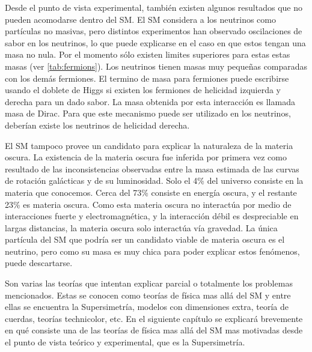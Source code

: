 Desde el punto de vista experimental, también existen algunos resultados que no
pueden acomodarse dentro del SM. El SM considera a los neutrinos como partículas
no masivas, pero distintos
experimentos\cite{PhysRevLett.101.111301,PhysRevD.78.032002} han observado
oscilaciones de sabor en los neutrinos, lo que puede explicarse en el caso en
que estos tengan una masa no nula. Por el momento sólo existen limites
superiores para estas estas masas (ver \cref{tab:fermions}). Los neutrinos
tienen masas muy peque\~nas comparadas con los demás fermiones. El termino de
masa para fermiones puede escribirse usando el doblete de Higgs si existen los
fermiones de helicidad izquierda y derecha para un dado sabor. La masa obtenida
por esta interacción es llamada masa de Dirac. Para que este mecanismo puede ser
utilizado en los neutrinos, deberían existe los neutrinos de helicidad derecha.

El SM tampoco provee un candidato para explicar la naturaleza de la materia
oscura. La existencia de la materia oscura fue inferida por primera vez como
resultado de las inconsistencias observadas entre la masa estimada de las curvas
de rotación galácticas y de su luminosidad\cite{DM1}.
Solo el 4\% del universo consiste en la materia que
conocemos\cite{DM2}. Cerca del 73\% consiste en energía oscura, y el restante
23\% es materia oscura. Como esta materia oscura no interactúa por medio de
interacciones fuerte y electromagnética, y la interacción débil es despreciable
en largas distancias, la materia oscura solo interactúa vía gravedad. La única
partícula del SM que podría ser un candidato viable de materia oscura es el
neutrino, pero como su masa es muy chica para poder explicar estos fenómenos,
puede descartarse.


Son varias las teorías que intentan explicar parcial o totalmente los problemas
mencionados. Estas se conocen como teorías de física mas allá del SM y entre
ellas se encuentra la Supersimetría, modelos con dimensiones extra, teoría de
cuerdas, teorías technicolor, etc. En el siguiente capítulo se explicará brevemente
en qué consiste una de las teorías de física mas allá del SM mas motivadas desde
el punto de vista teórico y experimental, que es la Supersimetría.
